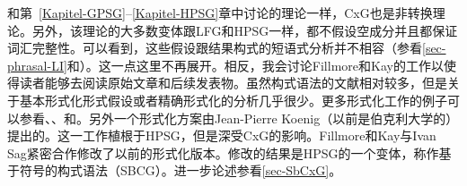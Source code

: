 \addlines
和第~\ref{Kapitel-GPSG}--\ref{Kapitel-HPSG}章中讨论的理论一样，CxG也是非转换理论。另外，该理论的大多数变体跟LFG和HPSG一样，都不假设空成分并且都保证词汇完整性。可以看到，这些假设跟结果构式的短语式分析并不相容（参看\ref{sec-phrasal-LI}和\citealp{Mueller2006d,Mueller2007d}）。这一点这里不再展开。相反，我会讨论Fillmore和Kay的工作以使得读者能够去阅读原始文章和后续发表物。虽然构式语法的文献相对较多，但是关于基本形式化形式假设或者精确形式化的分析几乎很少。更多形式化工作的例子可以参看、\citet{Kay2002a}、和。另外一个形式化方案由Jean-Pierre Koenig\citeyearpar{Koenig99a}（以前是伯克利大学的）提出的。这一工作植根于HPSG，但是深受CxG的影响。Fillmore和Kay与Ivan Sag紧密合作修改了以前的形式化版本。修改的结果是HPSG的一个变体，称作基于符号的构式语法（SBCG）\citep{Sag2010b,Sag2012a}。进一步论述参看\ref{sec-SbCxG}。

